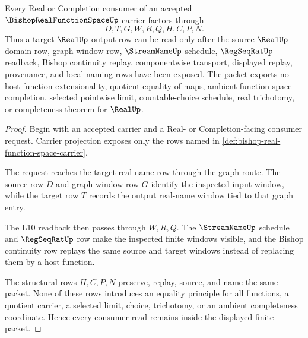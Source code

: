 \begin{theorem}\label{thm:bishop-real-function-space-nonescape}
Every Real or Completion consumer of an accepted $\BishopRealFunctionSpaceUp$ carrier factors through
$$
D,T,G,W,R,Q,H,C,P,N .
$$
Thus a target $\RealUp$ output row can be read only after the source $\RealUp$ domain row, graph-window row, $\StreamNameUp$ schedule, $\RegSeqRatUp$ readback, Bishop continuity replay, componentwise transport, displayed replay, provenance, and local naming rows have been exposed. The packet exports no host function extensionality, quotient equality of maps, ambient function-space completion, selected pointwise limit, countable-choice schedule, real trichotomy, or completeness theorem for $\RealUp$.
\end{theorem}
\begin{proof}
Begin with an accepted carrier and a Real- or Completion-facing consumer request. Carrier projection exposes only the rows named in \autoref{def:bishop-real-function-space-carrier}.

The request reaches the target real-name row through the graph route. The source row $D$ and graph-window row $G$ identify the inspected input window, while the target row $T$ records the output real-name window tied to that graph entry.

The L10 readback then passes through $W,R,Q$. The $\StreamNameUp$ schedule and $\RegSeqRatUp$ row make the inspected finite windows visible, and the Bishop continuity row replays the same source and target windows instead of replacing them by a host function.

The structural rows $H,C,P,N$ preserve, replay, source, and name the same packet. None of these rows introduces an equality principle for all functions, a quotient carrier, a selected limit, choice, trichotomy, or an ambient completeness coordinate. Hence every consumer read remains inside the displayed finite packet.
\end{proof}



